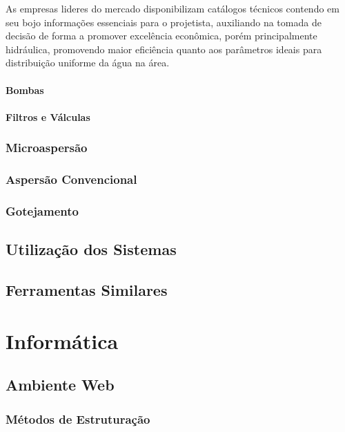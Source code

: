\documentclass[12pt,a4paper]{book}
\begin{document}
As empresas lideres do mercado disponibilizam catálogos técnicos contendo em seu bojo informações essenciais para o projetista, auxiliando na tomada de decisão de forma a promover excelência econômica, porém principalmente hidráulica, promovendo maior eficiência quanto aos parâmetros ideais para distribuição uniforme da água na área.
\subsubsection{Bombas}

\subsubsection{Filtros e Válculas}


\subsection{Microaspersão}

\subsection{Aspersão Convencional}

\subsection{Gotejamento}


\section{Utilização dos Sistemas}

\section{Ferramentas Similares}



\chapter{Informática}

\section{Ambiente Web}
\subsection{Métodos de Estruturação}
\end{document}

